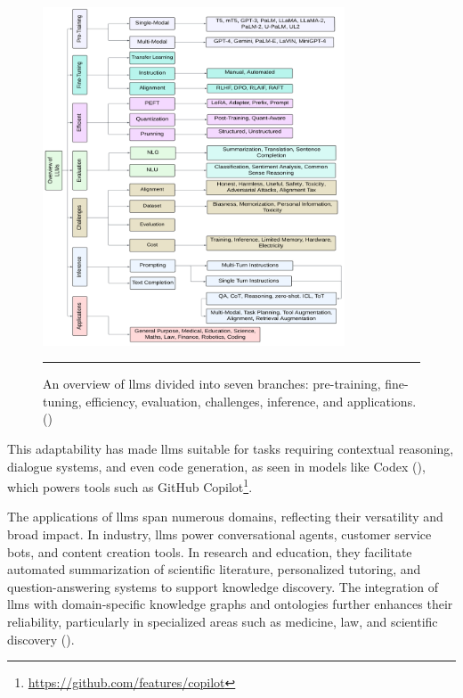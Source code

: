 \begin{figure}[htbp]
    \centering
 \includegraphics[width=0.8\textwidth]{03_Figures/literature-review/llms-overview.png}
     \rule{35em}{0.5pt}
    \caption{An overview of \glspl{llm} divided into seven branches: pre-training, fine-tuning, efficiency, evaluation, challenges, inference, and applications. (\cite{Naveed2023})}
 \label{fig:llms-overview}
\end{figure}

This adaptability has made \glspl{llm} suitable for tasks requiring contextual reasoning, dialogue systems, and even code generation, as seen in models like Codex (\cite{Chen2021EvaluatingLL}), which powers tools such as GitHub Copilot\footnote{\url{https://github.com/features/copilot}}.

The applications of \glspl{llm} span numerous domains, reflecting their versatility and broad impact.
In industry, \glspl{llm} power conversational agents, customer service bots, and content creation tools.
In research and education, they facilitate automated summarization of scientific literature, personalized tutoring, and question-answering systems to support knowledge discovery.
The integration of \glspl{llm} with domain-specific knowledge graphs and ontologies further enhances their reliability, particularly in specialized areas such as medicine, law, and scientific discovery (\cite{Yang2024}).

